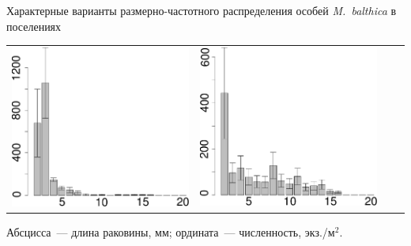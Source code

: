 \documentclass{beamer}
\begin{document}
\begin{frame}{Характерные варианты размерно-частотного распределения особей {\it M.~balthica} в поселениях}
\begin{tabularx}{\linewidth}{XX|XX}
			\includegraphics[width=\linewidth]{sizestr2_1999_.pdf} &
			\includegraphics[width=\linewidth]{zostera_zone2_2004_.pdf}  \\
\end{tabularx}
{\tiny Абсцисса~--- длина раковины, мм; ордината~--- численность, экз./м$^2$.}
\end{frame}
\end{document}

